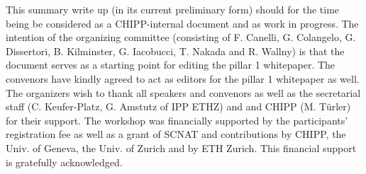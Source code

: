  \noindent This summary write up (in its current preliminary form) should for the time being  be considered as a CHIPP-internal document and as work in progress. The intention of the organizing
 committee (consisting of F. Canelli, G. Colangelo, G. Dissertori, B. Kilminster, G. Iacobucci,  T. Nakada and R. Wallny) is that the document serves as a starting point for editing
 the pillar 1 whitepaper. The convenors have kindly agreed to act as editors for the pillar 1 whitepaper as well.  The organizers wish to thank all speakers and convenors as well as the
 secretarial staff (C. Keufer-Platz, G. Amstutz of IPP ETHZ) and and CHIPP (M. T\"urler) for their support. The workshop was financially supported by the participants' registration fee as well
 as a grant of SCNAT and contributions by CHIPP,  the Univ. of Geneva, the  Univ. of Zurich and by ETH Zurich. This financial support is gratefully acknowledged.
 
  